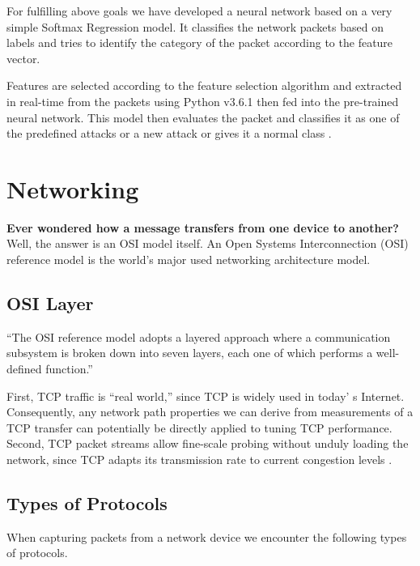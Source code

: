 \documentclass[12pt]{article}
\theoremstyle{definition}
\begin{document}
		For fulfilling above goals we have developed a neural network based on a very simple Softmax Regression model. It classifies the network packets based on labels and tries to identify the category of the packet according to the feature vector.
		
		Features are selected according to the feature selection algorithm and extracted in real-time from the packets using Python v3.6.1 then fed into the pre-trained neural network. This model then evaluates the packet and classifies it as one of the predefined attacks or a new attack or gives it a normal class \cite{Iqbal2016}.
		
	
	
	\cleardoublepage
	\section{Networking}\label{sec:netwrk}
	\textbf{Ever wondered how a message transfers from one device to another?}\\ 
	
	Well,   the   answer   is   an   OSI   model   itself.   An   Open Systems  Interconnection  (OSI)  reference  model  is  the world’s major used networking architecture model.
	
		\subsection{OSI Layer}
		``The  OSI  reference  model  adopts  a  layered  approach 
		where  a  communication subsystem  is  broken  down  into seven  layers,  each  one  of  which  performs  a well-defined function.''
		
		 First, TCP traffic is “real world,” since TCP is widely used in today' s Internet\cite{Gupta2016}.  Consequently, any network path properties we can derive from measurements of a TCP transfer can potentially be directly applied to tuning TCP performance.  Second, TCP packet streams  allow  fine-scale  probing  without  unduly  loading  the  network, since TCP adapts its transmission rate to current congestion levels \cite{Al-Yaseen2016}.
	 
		\subsection{Types of Protocols}
			When capturing packets from a network device we encounter the following types of protocols.
			
\end{document}
